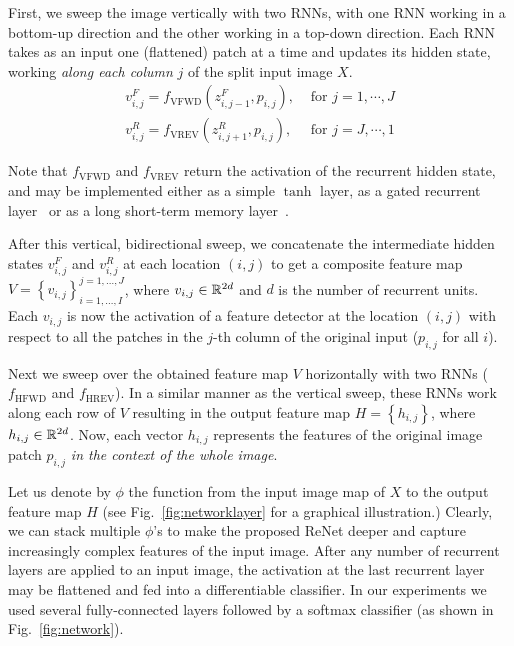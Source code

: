 First, we sweep the image vertically with two RNNs, with one RNN working in
a bottom-up direction and the other working in a top-down direction.
Each RNN takes as an input one (flattened) patch at a time and updates its
hidden state, working \emph{along each column} $j$ of the split input image $X$.
\begin{align}
    v^F_{i,j} = f_{\text{VFWD}}(z^F_{i,j-1},p_{i,j}), &\text{ for
    }j=1,\cdots, J\\
    v^R_{i,j} = f_{\text{VREV}}(z^R_{i,j+1},p_{i,j}), &\text{ for
    }j=J,\cdots,1
\end{align}

Note that $f_{\text{VFWD}}$ and $f_{\text{VREV}}$ return the activation of the
recurrent hidden state, and may be implemented either as a simple $\tanh$ layer,
as a gated recurrent layer~\citep{Cho2014} or as a long short-term memory
layer~\citep{Hochreiter+Schmidhuber-1997}.

After this vertical, bidirectional sweep, we concatenate the intermediate hidden
states $v^F_{i,j}$ and $v^R_{i,j}$ at each location $(i,j)$ to get a composite
feature map $V= \left\{ v_{i,j} \right\}_{i=1,\ldots,I}^{j=1,\ldots,J}$, where
$v_{i,j} \in \mathbb{R}^{2d}$ and $d$ is the number of recurrent units.
Each $v_{i,j}$ is now the activation of a feature detector at the location
$(i,j)$ with respect to all the patches in the $j$-th column of the original
input ($p_{i, j}$ for all $i$).

Next we sweep over the obtained feature map $V$ horizontally with two RNNs
($f_{\text{HFWD}}$ and $f_{\text{HREV}}$).
In a similar manner as the vertical sweep, these RNNs work along each row
of $V$ resulting in the output feature map $H = \left\{ h_{i,j} \right\}$, where
$h_{i,j} \in \mathbb{R}^{2d}$. Now, each vector $h_{i,j}$ represents the features of
the original image patch $p_{i,j}$ \emph{in the context of the whole image}.

Let us denote by $\phi$ the function from the input image map of $X$ to
the output feature map $H$ (see Fig.~\ref{fig:networklayer} for a graphical
illustration.) Clearly, we can stack multiple $\phi$'s to make the
proposed ReNet deeper and capture increasingly complex features of the input
image. After any number of recurrent layers are applied to an input image,
the activation at the last recurrent layer may be flattened and fed into a
differentiable classifier. In our experiments we used several
fully-connected layers followed by a softmax classifier (as shown in Fig.~\ref{fig:network}).

